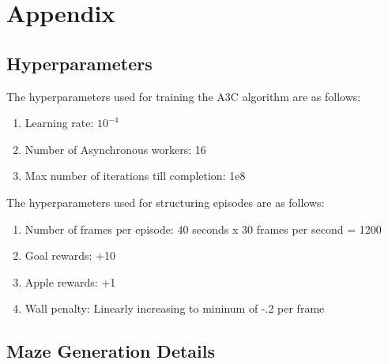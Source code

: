 
\section*{Appendix}

\subsection*{Hyperparameters}
The hyperparameters used for training the A3C algorithm are as follows:
\begin{enumerate}
    \item Learning rate: $10^{-4}$
    \item Number of Asynchronous workers: 16
    \item Max number of iterations till completion: 1e8

\end{enumerate}

The hyperparameters used for structuring episodes are as follows:
\begin{enumerate}
    \item Number of frames per episode: 40 seconds x 30 frames per second = 1200 
    \item Goal rewards: +10
    \item Apple rewards: +1
    \item Wall penalty: Linearly increasing to mininum of -.2 per frame
\end{enumerate}


\subsection*{Maze Generation Details}




